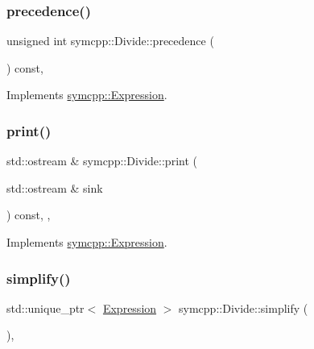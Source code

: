 \subsubsection{\texorpdfstring{precedence()}{precedence()}}
{\footnotesize\ttfamily unsigned int symcpp\+::\+Divide\+::precedence (\begin{DoxyParamCaption}{ }\end{DoxyParamCaption}) const\hspace{0.3cm}{\ttfamily [override]}, {\ttfamily [virtual]}}



Implements \mbox{\hyperlink{classsymcpp_1_1Expression_a181c162d5740faac392ffdca26bfca0c}{symcpp\+::\+Expression}}.

\mbox{\label{classsymcpp_1_1Divide_a113a96148c27f2d50a596c782f9a4005}} 
\subsubsection{\texorpdfstring{print()}{print()}}
{\footnotesize\ttfamily std\+::ostream \& symcpp\+::\+Divide\+::print (\begin{DoxyParamCaption}\item[{std\+::ostream \&}]{sink }\end{DoxyParamCaption}) const\hspace{0.3cm}{\ttfamily [override]}, {\ttfamily [private]}, {\ttfamily [virtual]}}



Implements \mbox{\hyperlink{classsymcpp_1_1Expression_af37e13032a40f2da4d2866eaa8658049}{symcpp\+::\+Expression}}.

\mbox{\label{classsymcpp_1_1Divide_ab0e372a337f207a3e4c78fd1db9351a7}} 
\subsubsection{\texorpdfstring{simplify()}{simplify()}}
{\footnotesize\ttfamily std\+::unique\+\_\+ptr$<$ \mbox{\hyperlink{classsymcpp_1_1Expression}{Expression}} $>$ symcpp\+::\+Divide\+::simplify (\begin{DoxyParamCaption}{ }\end{DoxyParamCaption})\hspace{0.3cm}{\ttfamily [override]}, {\ttfamily [virtual]}}



